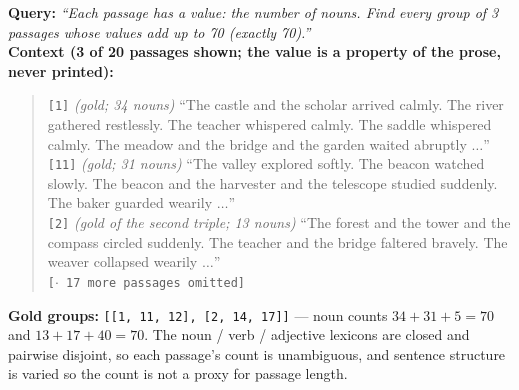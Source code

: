 \textbf{Query:} \emph{``Each passage has a value: the number of nouns. Find every group of 3 passages
whose values add up to 70 (exactly 70).''}\\
\textbf{Context (3 of 20 passages shown; the value is a property of the prose, never printed):}
\begin{quote}\small
\texttt{[1]} \emph{(gold; 34 nouns)} ``The castle and the scholar arrived calmly. The river gathered
restlessly. The teacher whispered calmly. The saddle whispered calmly. The meadow and the bridge and
the garden waited abruptly $\dots$''\\
\texttt{[11]} \emph{(gold; 31 nouns)} ``The valley explored softly. The beacon watched slowly. The
beacon and the harvester and the telescope studied suddenly. The baker guarded wearily $\dots$''\\
\texttt{[2]} \emph{(gold of the second triple; 13 nouns)} ``The forest and the tower and the compass
circled suddenly. The teacher and the bridge faltered bravely. The weaver collapsed wearily
$\dots$''\\
\texttt{[$\cdot$ 17 more passages omitted]}
\end{quote}
\textbf{Gold groups:} \texttt{[[1, 11, 12], [2, 14, 17]]} --- noun counts $34{+}31{+}5 = 70$ and
$13{+}17{+}40 = 70$. The noun / verb / adjective lexicons are closed and pairwise disjoint, so each
passage's count is unambiguous, and sentence structure is varied so the count is not a proxy for
passage length.
